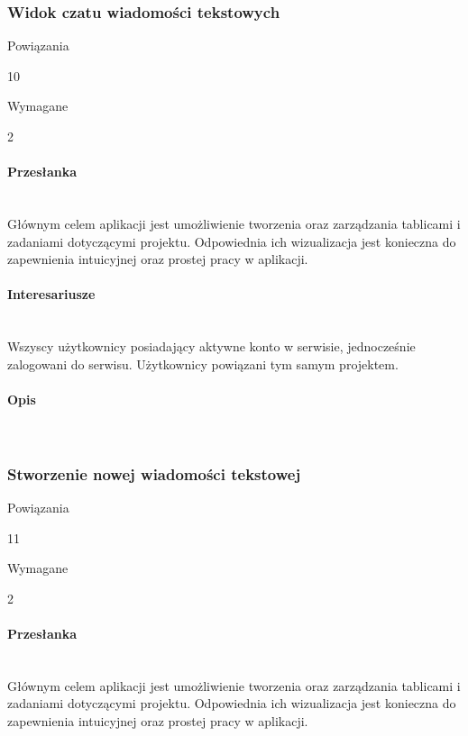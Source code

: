 \documentclass[eng,printmode]{mgr}
\begin{document}
\subsubsection{Widok czatu wiadomości tekstowych}
\begin{labeling}{Powiązania}
\item [ID:] 10
\item [Typ:] Wymagane
\item [Powiązania] 2
\end{labeling}

\paragraph{Przesłanka}\ \\
Głównym celem aplikacji jest umożliwienie tworzenia oraz zarządzania tablicami i zadaniami dotyczącymi projektu. Odpowiednia ich wizualizacja jest konieczna do zapewnienia intuicyjnej oraz prostej pracy w aplikacji.

\paragraph{Interesariusze}\ \\
Wszyscy użytkownicy posiadający aktywne konto w serwisie, jednocześnie zalogowani do serwisu. Użytkownicy powiązani tym samym projektem.

\paragraph{Opis}\ \\
\newpage

\subsubsection{Stworzenie nowej wiadomości tekstowej}
\begin{labeling}{Powiązania}
\item [ID:] 11
\item [Typ:] Wymagane
\item [Powiązania] 2
\end{labeling}
\paragraph{Przesłanka}\ \\
Głównym celem aplikacji jest umożliwienie tworzenia oraz zarządzania tablicami i zadaniami dotyczącymi projektu. Odpowiednia ich wizualizacja jest konieczna do zapewnienia intuicyjnej oraz prostej pracy w aplikacji.
\end{document}
